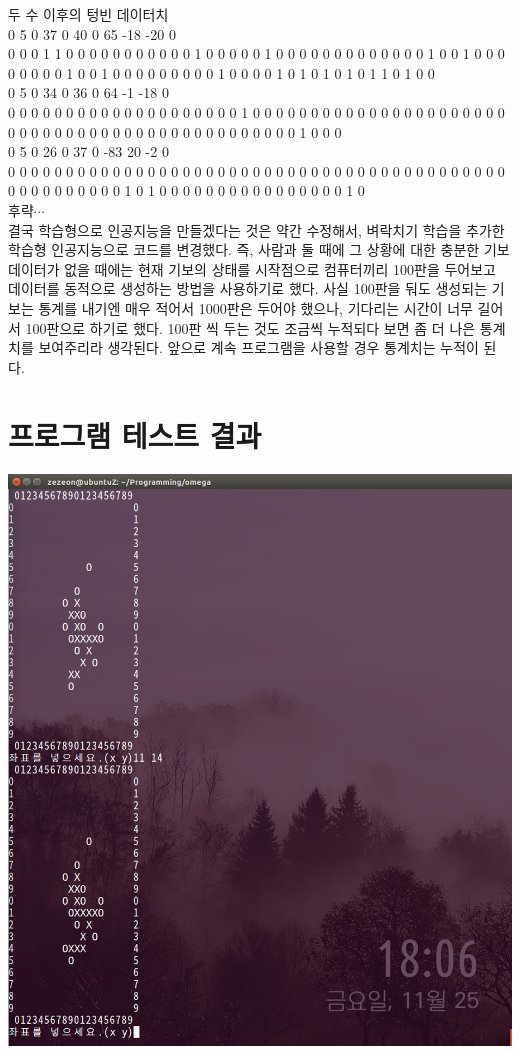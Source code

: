 \documentclass[12pt,a4paper]{report}
\begin{document}
두 수 이후의 텅빈 데이터치\\
0 5 0 37 0 40 0 65 -18 -20 0 \\
0 0 0 1 1 0 0 0 0 0 0 0 0 0 0 0 1 0 0 0 0 0 1 0 0 0 0 0 0 0 0 0 0 0 0 0 1 0 0 1 0 0 0 0 0 0 0 0 1 0 0 1 0 0 0 0 0 0 0 0 0 1 0 0 0 0 1 0 1 0 1 0 1 0 1 1 0 1 0 0 \\
0 5 0 34 0 36 0 64 -1 -18 0 \\
0 0 0 0 0 0 0 0 0 0 0 0 0 0 0 0 0 0 0 0 1 0 0 0 0 0 0 0 0 0 0 0 0 0 0 0 0 0 0 0 0 0 0 0 0 0 0 0 0 0 0 0 0 0 0 0 0 0 0 0 0 0 0 0 0 0 0 0 1 0 0 0 \\
0 5 0 26 0 37 0 -83 20 -2 0 \\
0 0 0 0 0 0 0 0 0 0 0 0 0 0 0 0 0 0 0 0 0 0 0 0 0 0 0 0 0 0 0 0 0 0 0 0 0 0 0 0 0 0 0 0 0 0 0 0 0 0 0 0 0 1 0 1 0 0 0 0 0 0 0 0 0 0 0 0 0 0 0 0 1 0 \\
후략$\cdots$
\\

결국 학습형으로 인공지능을 만들겠다는 것은 약간 수정해서, 벼락치기 학습을 추가한 학습형 인공지능으로 코드를 변경했다.
즉, 사람과 둘 때에 그 상황에 대한 충분한 기보데이터가 없을 때에는 현재 기보의 상태를 시작점으로 컴퓨터끼리 100판을 두어보고 데이터를 동적으로 생성하는 방법을 사용하기로 했다.
사실 100판을 둬도 생성되는 기보는 통계를 내기엔 매우 적어서 1000판은 두어야 했으나, 기다리는 시간이 너무 길어서 100판으로 하기로 했다.
100판 씩 두는 것도 조금씩 누적되다 보면 좀 더 나은 통계치를 보여주리라 생각된다.
앞으로 계속 프로그램을 사용할 경우 통계치는 누적이 된다.


%
%

\section{프로그램 테스트 결과}
\includegraphics[width=\textwidth]{p.png}
\end{document}
